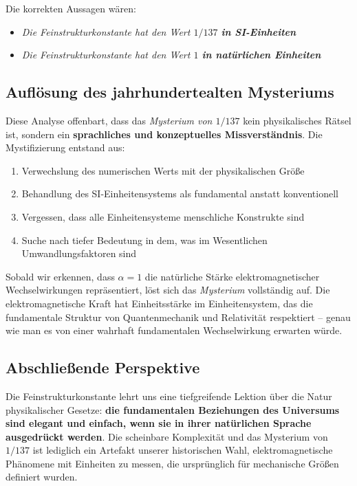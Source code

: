 	Die korrekten Aussagen wären:
	\begin{itemize}
		\item[\textcolor{green}{$\checkmark$}] \textit{Die Feinstrukturkonstante hat den Wert $1/137$ \textbf{in SI-Einheiten}}
		\item[\textcolor{green}{$\checkmark$}] \textit{Die Feinstrukturkonstante hat den Wert $1$ \textbf{in natürlichen Einheiten}}
	\end{itemize}
	
	\subsection{Auflösung des jahrhundertealten Mysteriums}
	
	Diese Analyse offenbart, dass das \textit{Mysterium von $1/137$} kein physikalisches Rätsel ist, sondern ein \textbf{sprachliches und konzeptuelles Missverständnis}. Die Mystifizierung entstand aus:
	
	\begin{enumerate}
		\item Verwechslung des numerischen Werts mit der physikalischen Größe
		\item Behandlung des SI-Einheitensystems als fundamental anstatt konventionell
		\item Vergessen, dass alle Einheitensysteme menschliche Konstrukte sind
		\item Suche nach tiefer Bedeutung in dem, was im Wesentlichen Umwandlungsfaktoren sind
	\end{enumerate}
	
	Sobald wir erkennen, dass $\alpha = 1$ die natürliche Stärke elektromagnetischer Wechselwirkungen repräsentiert, löst sich das \textit{Mysterium} vollständig auf. Die elektromagnetische Kraft hat Einheitsstärke im Einheitensystem, das die fundamentale Struktur von Quantenmechanik und Relativität respektiert -- genau wie man es von einer wahrhaft fundamentalen Wechselwirkung erwarten würde.
	
	\subsection{Abschließende Perspektive}
	
	Die Feinstrukturkonstante lehrt uns eine tiefgreifende Lektion über die Natur physikalischer Gesetze: \textbf{die fundamentalen Beziehungen des Universums sind elegant und einfach, wenn sie in ihrer natürlichen Sprache ausgedrückt werden}. Die scheinbare Komplexität und das Mysterium von \textit{$1/137$} ist lediglich ein Artefakt unserer historischen Wahl, elektromagnetische Phänomene mit Einheiten zu messen, die ursprünglich für mechanische Größen definiert wurden.
	
